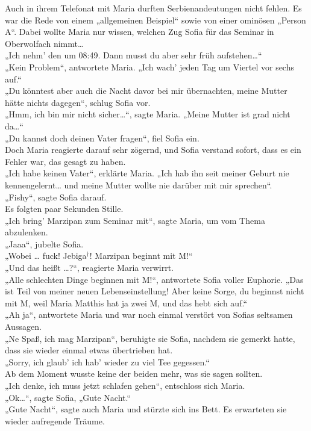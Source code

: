 \documentclass[oneside]{memoir}
\begin{document}
\bigskip
\noindent Auch in ihrem Telefonat mit Maria durften Serbienandeutungen nicht fehlen. Es war die Rede von einem „allgemeinen Beispiel“ sowie von einer ominösen „Person A“. Dabei wollte Maria nur wissen, welchen Zug Sofia für das Seminar in Oberwolfach nimmt\ldots \\
„Ich nehm' den um 08:49. Dann musst du aber sehr früh aufstehen\ldots“ \\
„Kein Problem“, antwortete Maria. „Ich wach' jeden Tag um Viertel vor sechs auf.“ \\
„Du könntest aber auch die Nacht davor bei mir übernachten, meine Mutter hätte nichts dagegen“, schlug Sofia vor. \\
„Hmm, ich bin mir nicht sicher\ldots“, sagte Maria. „Meine Mutter ist grad nicht da\ldots“ \\
„Du kannst doch deinen Vater fragen“, fiel Sofia ein. \\
Doch Maria reagierte darauf sehr zögernd, und Sofia verstand sofort, dass es ein Fehler war, das gesagt zu haben. \\
„Ich habe keinen Vater“, erklärte Maria. „Ich hab ihn seit meiner Geburt nie kennengelernt\ldots{} und meine Mutter wollte nie darüber mit mir sprechen“. \\
„Fishy“, sagte Sofia darauf. \\
Es folgten paar Sekunden Stille. \\
„Ich bring' Marzipan zum Seminar mit“,  sagte Maria, um vom Thema abzulenken. \\
„Jaaa“, jubelte Sofia. \\
„Wobei \ldots{} fuck! Jebiga$^{\dagger}$! Marzipan beginnt mit M!“ \\
„Und das heißt \ldots?“, reagierte Maria verwirrt. \\
„Alle schlechten Dinge beginnen mit M!“, antwortete Sofia voller Euphorie. „Das ist Teil von meiner neuen Lebenseinstellung! Aber keine Sorge, du beginnst nicht mit M, weil Maria Matthis hat ja zwei M, und das hebt sich auf.“ \\
„Ah ja“, antwortete Maria und war noch einmal verstört von Sofias seltsamen Aussagen. \\
„Ne Spaß, ich mag Marzipan“, beruhigte sie Sofia, nachdem sie gemerkt hatte, dass sie wieder einmal etwas übertrieben hat. \\
„Sorry, ich glaub' ich hab' wieder zu viel Tee gegessen.“ \\
Ab dem Moment wusste keine der beiden mehr, was sie sagen sollten. \\
„Ich denke, ich muss jetzt schlafen gehen“, entschloss sich Maria. \\
„Ok\ldots“, sagte Sofia, „Gute Nacht.“ \\
„Gute Nacht“, sagte auch Maria und stürzte sich ins Bett. 
Es erwarteten sie wieder aufregende Träume.
\end{document}
